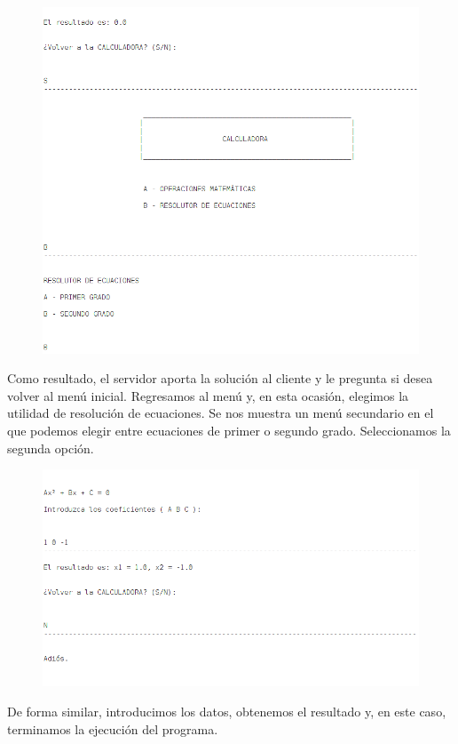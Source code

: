 \documentclass[a4paper, 11pt]{article}
\theoremstyle{plain}
\begin{document}
\begin{figure}[!h]
	\centering
	\includegraphics[scale=0.5]{./Img/Captura2}
\end{figure}

\newpage
Como resultado, el servidor aporta la solución al cliente y le pregunta si desea volver al menú inicial. Regresamos al menú y, en esta ocasión, elegimos la utilidad de resolución de ecuaciones. Se nos muestra un menú secundario en el que podemos elegir entre ecuaciones de primer o segundo grado. Seleccionamos la segunda opción.

\newpage
\begin{figure}[!h]
		\centering
		\includegraphics[scale=0.5]{./Img/Captura3}
\end{figure}

De forma similar, introducimos los datos, obtenemos el resultado y, en este caso, terminamos la ejecución del programa.
\end{document}
